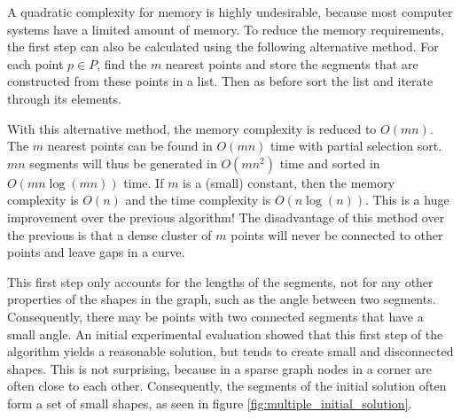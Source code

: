 \documentclass[11pt]{article}
\begin{document}
A quadratic complexity for memory is highly undesirable, because most computer systems have a limited amount of memory. To reduce the memory requirements, the first step can also be calculated using the following alternative method. For each point $p \in P$, find the $m$ nearest points and store the segments that are constructed from these points in a list. Then as before sort the list and iterate through its elements.

With this alternative method, the memory complexity is reduced to $O(mn)$. The $m$ nearest points can be found in $O(mn)$ time with partial selection sort.
 $mn$ segments will thus be generated in $O(mn^2)$ time and sorted in $O(mn\log(mn))$ time. If $m$ is a (small) constant, then the memory complexity is $O(n)$ and the time complexity is $O(n\log(n))$. This is a huge improvement over the previous algorithm! The disadvantage of this method over the previous is that a dense cluster of $m$ points will never be connected to other points and leave gaps in a curve.

This first step only accounts for the lengths of the segments, not for any other properties of the shapes in the graph, such as the angle between two segments. Consequently, there may be points with two connected segments that have a small angle. An initial experimental evaluation showed that this first step of the algorithm yields a reasonable solution, but tends to create small and disconnected shapes. This is not surprising, because in a sparse graph nodes in a corner are often close to each other. Consequently, the segments of the initial solution often form a set of small shapes, as seen in figure \ref{fig:multiple_initial_solution}.
\end{document}
